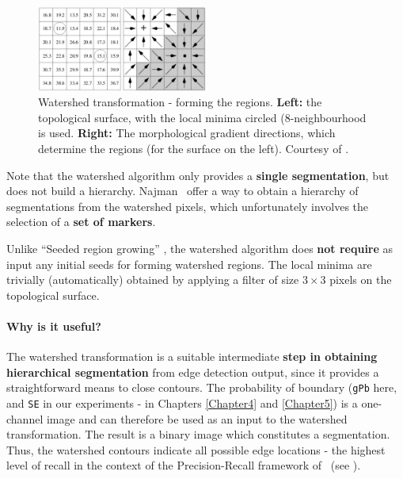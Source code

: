 \begin{figure}[t]
 \centering
 \includegraphics[width=0.5\textwidth]{images/gPb-OWT-UCM/watershed-transformation-forming-regions.png}
 \caption[Watershed transformation - forming the regions]{Watershed transformation - forming the regions. {\bf Left:} the topological surface, with the local minima circled (8-neighbourhood is used. %
 {\bf Right:} The morphological gradient directions, which determine the regions (for the surface on the left). Courtesy of \cite{MarcoBlog2007Watershed}.}
 \label{fig:watershed-transformation-forming-regions}
\end{figure}

Note that the watershed algorithm only provides a {\bf single segmentation}, but does not build a hierarchy. %
Najman~\etal \cite{Najman1996geodesic} offer a way to obtain a hierarchy of segmentations from the watershed pixels, which unfortunately involves the selection of a {\bf set of markers}.

Unlike ``Seeded region growing'' \cite{Adams1994seeded}, the watershed algorithm does {\bf not require} as input any initial seeds for forming watershed regions. The local minima are trivially (automatically) obtained by applying a filter of size $3\times 3$ pixels on the topological surface.

\paragraph{Why is it useful?} The watershed transformation is a suitable intermediate {\bf step in obtaining hierarchical segmentation} from edge detection output, since it provides a straightforward means to close contours. The probability of boundary ({\tt gPb} here, and {\tt SE} in our experiments - in Chapters \ref{Chapter4} and \ref{Chapter5}) is a one-channel image and can therefore be used as an input to the watershed transformation. The result is a binary image which constitutes a segmentation. Thus, the watershed contours indicate all possible edge locations - the highest level of recall in the context of the Precision-Recall framework of~\cite{Arbelaez11} (see ). %

